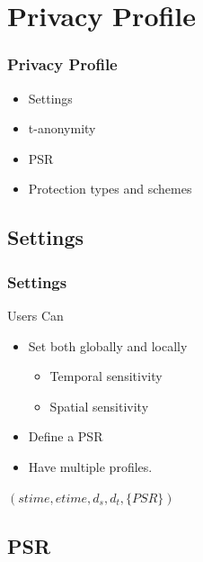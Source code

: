 \section{Privacy Profile}

\begin{frame}[red]
\frametitle{Privacy Profile}
\begin{itemize}
\item Settings
\item t-anonymity
\item PSR
\item Protection types and schemes
\end{itemize}
\end{frame}

\subsection{Settings} %

\begin{frame}[red] %
\frametitle{Settings}

Users Can
\begin{itemize}
	\item Set both globally and locally
	\begin{itemize}
		\item Temporal sensitivity
		\item Spatial sensitivity
	\end{itemize}
	\item Define a PSR
	\item Have multiple profiles.
\end{itemize}

\vspace{1em}
\begin{definition}
$\left(stime,etime,d_s, d_t,\{PSR \} \right)$
\end{definition}

\end{frame}



\subsection{PSR} %


